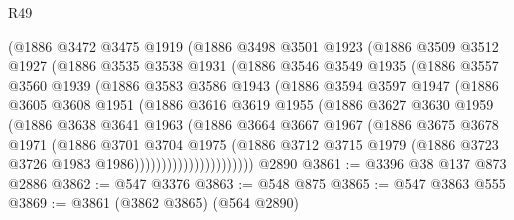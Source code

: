 \begin{lexlean}{R49}
\begin{coremodule}
              (@1886
                @3472
                @3475
                @1919
                (@1886
                  @3498
                  @3501
                  @1923
                  (@1886
                    @3509
                    @3512
                    @1927
                    (@1886
                      @3535
                      @3538
                      @1931
                      (@1886
                        @3546
                        @3549
                        @1935
                        (@1886
                          @3557
                          @3560
                          @1939
                          (@1886
                            @3583
                            @3586
                            @1943
                            (@1886
                              @3594
                              @3597
                              @1947
                              (@1886
                                @3605
                                @3608
                                @1951
                                (@1886
                                  @3616
                                  @3619
                                  @1955
                                  (@1886
                                    @3627
                                    @3630
                                    @1959
                                    (@1886
                                      @3638
                                      @3641
                                      @1963
                                      (@1886
                                        @3664
                                        @3667
                                        @1967
                                        (@1886
                                          @3675
                                          @3678
                                          @1971
                                          (@1886
                                            @3701
                                            @3704
                                            @1975
                                            (@1886
                                              @3712
                                              @3715
                                              @1979
                                              (@1886 @3723 @3726 @1983 @1986))))))))))))))))))))))
    @2890
@3861 := @3396 @38 @137 @873 @2886
@3862 := @547 @3376
@3863 := @548 @875
@3865 := @547 @3863 @555
@3869 := @3861 (@3862 @3865) (@564 @2890)

\end{coremodule}
\end{lexlean}
